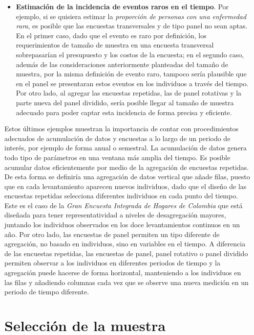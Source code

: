 \documentclass[12pt,spanish,]{book}
\begin{document}
\begin{itemize}
\item
  \textbf{Estimación de la incidencia de eventos raros en el tiempo}. Por ejemplo, si se quisiera estimar la \emph{proporción de personas con una enfermedad rara}, es posible que las encuestas transversales y de tipo panel no sean aptas. En el primer caso, dado que el evento es raro por definición, los requerimientos de tamaño de muestra en una encuesta transversal sobrepasarían el presupuesto y los costos de la encuesta; en el segundo caso, además de las consideraciones anteriormente planteadas del tamaño de muestra, por la misma definición de evento raro, tampoco sería plausible que en el panel se presentaran estos eventos en los individuos a través del tiempo. Por otro lado, al agregar las encuestas repetidas, las de panel rotativas y la parte nueva del panel dividido, sería posible llegar al tamaño de muestra adecuado para poder captar esta incidencia de forma precisa y eficiente.
\end{itemize}

Estos últimos ejemplos muestran la importancia de contar con procedimientos adecuados de acumulación de datos y encuestas a lo largo de un periodo de interés, por ejemplo de forma anual o semestral. La acumulación de datos genera todo tipo de parámetros en una ventana más amplia del tiempo. Es posible acumular datos eficientemente por medio de la agregación de encuestas repetidas. De esta forma se definiría una agregación de datos vertical que añade filas, puesto que en cada levantamiento aparecen nuevos individuos, dado que el diseño de las encuestas repetidas selecciona diferentes individuos en cada punto del tiempo. Este es el caso de la \emph{Gran Encuesta Integrada de Hogares de Colombia} que está diseñada para tener representatividad a niveles de desagregación mayores, juntando los individuos observados en los doce levantamientos continuos en un año. Por otro lado, las encuestas de panel permiten un tipo diferente de agregación, no basado en individuos, sino en variables en el tiempo. A diferencia de las encuestas repetidas, las encuestas de panel, panel rotativo o panel dividido permiten observar a los individuos en diferentes periodos de tiempo y la agregación puede hacerse de forma horizontal, manteniendo a los individuos en las filas y añadiendo columnas cada vez que se observe una nueva medición en un periodo de tiempo diferente.

\hypertarget{seleccion-de-la-muestra}{%
\chapter{Selección de la muestra}\label{seleccion-de-la-muestra}}
\end{document}
